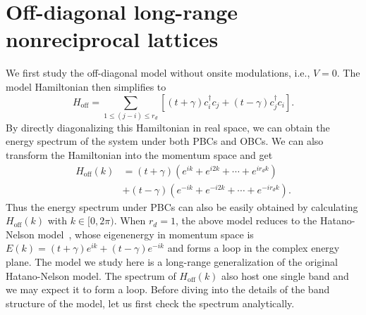 \documentclass[prb,aps,twocolumn,showpacs]{revtex4-2} %
\begin{document}
\section{Off-diagonal long-range nonreciprocal lattices}\label{sect3}
We first study the off-diagonal model without onsite modulations, i.e., $V=0$. The model Hamiltonian then simplifies to
\begin{equation}
H_\text{off} = \sum_{1 \leq (j-i) \leq r_d} [ (t+\gamma) c_i^\dagger c_j + (t-\gamma) c_j^\dagger c_i ].
\end{equation}
By directly diagonalizing this Hamiltonian in real space, we can obtain the energy spectrum of the system under both PBCs and OBCs. We can also transform the Hamiltonian into the momentum space and get 
\begin{equation}
\begin{split}
H_\text{off} (k) & = (t+\gamma) (e^{ik} + e^{i2k} + \cdots + e^{i r_d k}) \\
& + (t-\gamma) (e^{-ik} + e^{-i2k} + \cdots + e^{-i r_d k}).
\end{split}
\end{equation} 
Thus the energy spectrum under PBCs can also be easily obtained by calculating $H_\text{off}(k)$ with $k\in [0, 2\pi)$. When $r_d=1$, the above model reduces to the Hatano-Nelson model~\cite{Hatano1996PRL}, whose eigenenergy in momentum space is $E(k)=(t+\gamma) e^{ik} + (t-\gamma) e^{-ik}$ and forms a loop in the complex energy plane. The model we study here is a long-range generalization of the original Hatano-Nelson model. The spectrum of $H_\text{off} (k)$ also host one single band and we may expect it to form a loop. Before diving into the details of the band structure of the model, let us first check the spectrum analytically.
\end{document}
